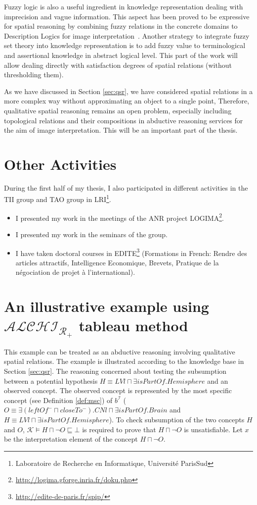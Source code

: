 \documentclass{article}
\begin{document}
Fuzzy logic is also a useful ingredient in knowledge representation dealing with imprecision and vague information.
This aspect has been proved to be expressive for spatial reasoning by combining fuzzy relations in the concrete domains to Description Logics for image interpretation~\cite{hudelot2008spatial}.
Another strategy to integrate fuzzy set theory into knowledge representation is to add fuzzy value to terminological and assertional knowledge in abstract logical level.
This part of the work will allow dealing directly with satisfaction degrees of spatial relations (without thresholding them).


As we have discussed in Section \ref{sec:qsr}, we have considered spatial relations in a more complex way without approximating an object to a single point,
Therefore, qualitative spatial reasoning remains an open problem, especially including topological relations and their compositions in abductive reasoning services for the aim of image interpretation.
This will be an important part of the thesis.

\section{Other Activities}
During the first half of my thesis, I also participated in different activities in the TII group and TAO group 
in LRI\footnote{Laboratoire de Recherche en Informatique, Universit\'{e} ParisSud}.
\begin{itemize}
 \item I presented my work in the meetings of the ANR project LOGIMA\footnote{\url{http://logima.gforge.inria.fr/doku.php}}.
 \item I presented my work in the seminars of the group.
 \item I have taken doctoral courses in EDITE\footnote{\url{http://edite-de-paris.fr/spip/}}
 (Formations in French: Rendre des articles attractifs, Intelligence Economique, Brevets, Pratique de la négociation de projet à l'international).
\end{itemize}

\appendix
\section{An illustrative example using $\mathcal{ALCHI_{R_+}}$ tableau method}
\label{Appendix A}

This example can be treated as an abductive reasoning involving qualitative spatial relations.
The example is illustrated according to the knowledge base in Section \ref{sec:qsr}.
The reasoning concerned about testing the subsumption between a potential hypothesis $H\equiv LVl\sqcap \exists isPartOf.Hemisphere$ and an observed concept.
The observed concept is represented by the most specific concept (see Definition \ref{def:msc}) of  $b^\mathcal{I}$
($O\equiv \exists (leftOf^-\sqcap closeTo^-). CNl\sqcap \exists isPartOf.Brain$ and $H\equiv LVl\sqcap \exists isPartOf.Hemisphere$).
To check subsumption of the two concepts $H$ and $O$, $\mathcal{K} \vDash H\sqcap \neg O \sqsubseteq \bot$ is required to prove that $H\sqcap \neg O$ is unsatisfiable.
Let $x$ be the interpretation element of the concept $H\sqcap \neg O$.
\end{document}
